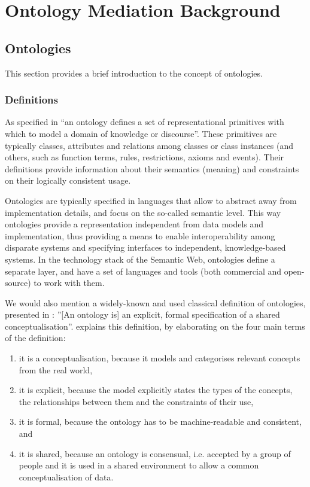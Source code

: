 \section{Ontology Mediation Background}
\label{sec:background}

\subsection{Ontologies}
\label{sec:ontologies}
This section provides a brief introduction to the concept of ontologies.

\subsubsection{Definitions}
As specified in \cite{gruber2008ontology} {\textquotedblleft}an ontology defines a
set of representational primitives with which to model a domain of
knowledge or discourse{\textquotedblright}. These primitives are
typically classes, attributes and relations among classes or class
instances (and others, such as function terms, rules, restrictions,
axioms and events). Their definitions provide information about their
semantics (meaning) and constraints on their logically consistent
usage. 

Ontologies are typically specified in languages that allow to abstract
away from implementation details, and focus on the so-called semantic
level. This way ontologies provide a representation independent from
data models and implementation, thus providing a means to enable
interoperability among disparate systems and specifying interfaces to
independent, knowledge-based systems. In the technology stack of the
Semantic Web, ontologies define a separate layer, and have a set of
languages and tools (both commercial and open-source) to work with
them. 

We would also mention a widely-known and used classical definition of
ontologies, presented in \cite{gruber93towards}: {\textquotedblright}[An
ontology is] an explicit, formal specification of a shared
conceptualisation{\textquotedblright}. \cite{studer1998knowledge_engineering_principles} explains
this definition, by elaborating on the four main terms of the
definition:

\begin{enumerate}
\item it is a conceptualisation, because it models and categorises
relevant concepts from the real world, 
\item it is explicit, because the model explicitly states the types of
the concepts, the relationships between them and the constraints of
their use, 
\item it is formal, because the ontology has to be machine-readable and
consistent, and 
\item it is shared, because an ontology is consensual, i.e. accepted by
a group of people and it is used in a shared environment to allow a
common conceptualisation of data. 
\end{enumerate}


